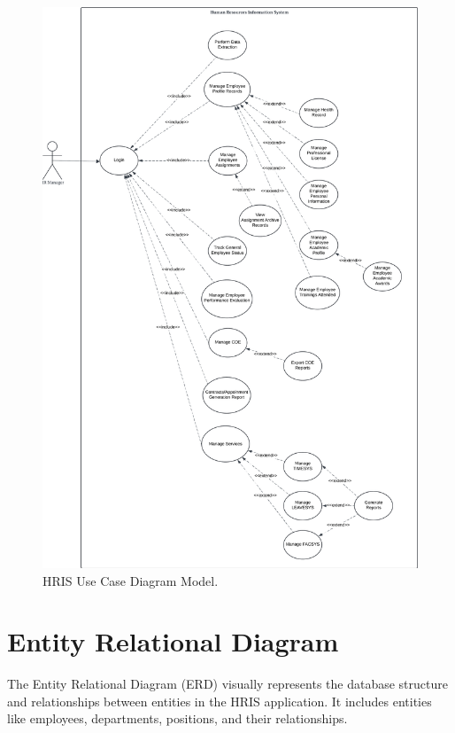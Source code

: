 \begin{figure}[H]
    \centering
    \includegraphics[width=0.9\linewidth]{figures/images/use-case.png}
    \caption{HRIS Use Case Diagram Model.}
    \label{fig:use-case}
\end{figure}

\section{Entity Relational Diagram}

The Entity Relational Diagram (ERD) visually represents the database structure and relationships between entities in the HRIS application. It includes entities like employees, departments, positions, and their relationships.

